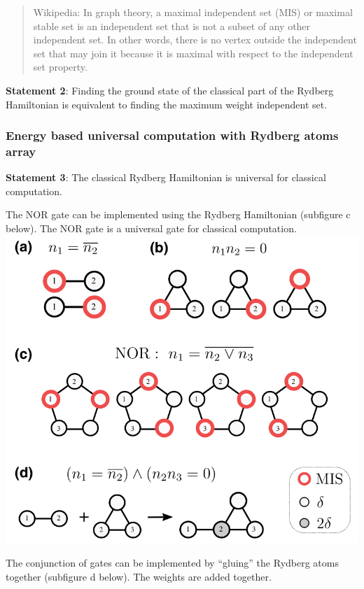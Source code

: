 \documentclass[twocolumn,superscriptaddress,english,showpacs,longbibliography]{revtex4-2}
\begin{document}
\begin{quote}
Wikipedia: In graph theory, a maximal independent set (MIS) or maximal
stable set is an independent set that is not a subset of any other
independent set. In other words, there is no vertex outside the
independent set that may join it because it is maximal with respect to
the independent set property.
\end{quote}

\textbf{Statement 2}: Finding the ground state of the classical part of
the Rydberg Hamiltonian is equivalent to finding the maximum weight
independent set.

\subsubsection{Energy based universal computation with Rydberg atoms
array}\label{energy-based-universal-computation-with-rydberg-atoms-array}

\textbf{Statement 3}: The classical Rydberg Hamiltonian is universal for classical computation.

The NOR gate can be implemented using the Rydberg Hamiltonian (subfigure
c below). The NOR gate is a universal gate for classical computation.
\includegraphics[width=\columnwidth]{../notes/images/gadgets.png}

The conjunction of gates can be implemented by ``gluing'' the Rydberg
atoms together (subfigure d below). The weights are added together.
\end{document}
